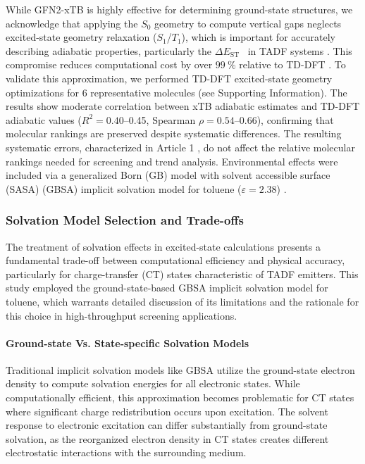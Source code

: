 \documentclass[journal=jcisd8,manuscript=article,keywords=true]{achemso}
\newcommand{\deltaest}{$\Delta E_{\text{ST}}$}
\begin{document}
While GFN2-xTB is highly effective for determining ground-state structures, we acknowledge
that applying the $S_0$ geometry to compute vertical gaps neglects excited-state geometry
relaxation ($S_1$/$T_1$), which is important for accurately describing adiabatic
properties, particularly the \deltaest~ in TADF systems \cite{Mewes2018, Olivier2017}.
This compromise reduces computational cost by over $\qty{99}{\percent}$ relative to TD-DFT
\cite{TchapetArxivA1-2025}. To validate this approximation, we performed TD-DFT excited-state geometry optimizations for 6 representative molecules (see Supporting Information). The results show moderate correlation between xTB adiabatic estimates and TD-DFT adiabatic values ($R^2 = 0.40$--0.45, Spearman $\rho = 0.54$--0.66), confirming that molecular rankings are preserved despite systematic differences. The resulting systematic errors, characterized in Article 1
\cite{TchapetArxivA1-2025}, do not affect the relative molecular rankings needed for
screening and trend analysis. Environmental effects were included via a generalized
Born (GB) model with solvent
accessible surface (SASA) (GBSA) implicit solvation model for toluene ($\varepsilon =
2.38$) \cite{Ehlert2021}.

\subsubsection{Solvation Model Selection and Trade-offs}

The treatment of solvation effects in excited-state calculations presents a fundamental trade-off between computational efficiency and physical accuracy, particularly for charge-transfer (CT) states characteristic of TADF emitters. This study employed the ground-state-based GBSA implicit solvation model for toluene, which warrants detailed discussion of its limitations and the rationale for this choice in high-throughput screening applications.

\paragraph{Ground-state Vs. State-specific Solvation Models}

Traditional implicit solvation models like GBSA utilize the ground-state electron density to compute solvation energies for all electronic states.\cite{Marenich2009} While computationally efficient, this approximation becomes problematic for CT states where significant charge redistribution occurs upon excitation.\cite{Chibani2012} The solvent response to electronic excitation can differ substantially from ground-state solvation, as the reorganized electron density in CT states creates different electrostatic interactions with the surrounding medium.\cite{Improta2006}
\end{document}
